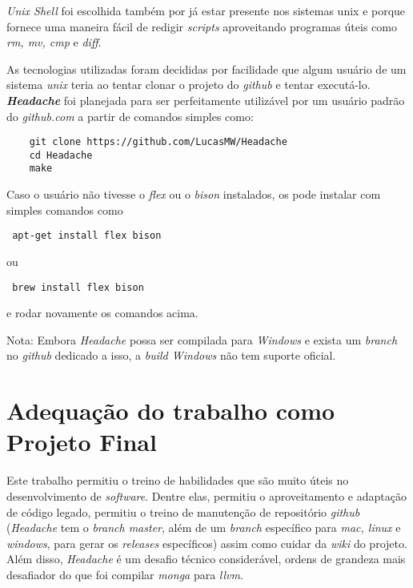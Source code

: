 \textit{Unix Shell} foi escolhida também por já estar presente nos sistemas unix e porque fornece uma maneira fácil de redigir \textit{scripts} aproveitando programas úteis como \textit{rm, mv, cmp} e \textit{diff}.

As tecnologias utilizadas foram decididas por facilidade que algum usuário de um sistema \textit{unix} teria ao tentar clonar o projeto do \textit{github} e tentar executá-lo. \textit{\textbf{Headache}} foi planejada para ser perfeitamente utilizável por um usuário padrão do \textit{github.com} a partir de comandos simples como:

\begin{verbatim}
    git clone https://github.com/LucasMW/Headache
    cd Headache
    make
\end{verbatim}

Caso o usuário não tivesse o \textit{flex} ou o \textit{bison} instalados, os pode instalar com simples comandos como 
\begin{verbatim} apt-get install flex bison \end{verbatim} 
ou 
\begin{verbatim} brew install flex bison \end{verbatim} e rodar novamente os comandos acima.

Nota: Embora \textit{Headache} possa ser compilada para \textit{Windows} e exista um \textit{branch} no \textit{github} dedicado a isso, a \textit{build Windows} não tem suporte oficial.

\section{Adequação do trabalho como Projeto Final}
Este trabalho permitiu o treino de habilidades que são muito úteis no desenvolvimento de \textit{software}. Dentre elas, permitiu o aproveitamento e adaptação de código legado, permitiu o treino de manutenção de repositório \textit{github} (\textit{Headache} tem o \textit{branch master}, além de um \textit{branch} específico para \textit{mac, linux} e \textit{windows}, para gerar os \textit{releases} específicos) assim como cuidar da \textit{wiki} do projeto. Além disso, \textit{Headache} é um desafio técnico considerável, ordens de grandeza mais desafiador do que foi compilar \textit{monga} para \textit{llvm}. 

